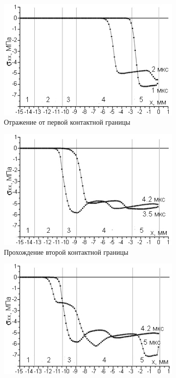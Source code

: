 \begin{figure}[h]
\centering
\begin{subfigure}[b]{0.6\textwidth}
\centering
\includegraphics[width=\textwidth]{png/cranium/1d-01.png}
\caption{Отражение от первой контактной границы}
\end{subfigure}
\begin{subfigure}[b]{0.6\textwidth}
\centering
\includegraphics[width=\textwidth]{png/cranium/1d-02.png}
\caption{Прохождение второй контактной границы}
\end{subfigure}
\begin{subfigure}[b]{0.6\textwidth}
\centering
\includegraphics[width=\textwidth]{png/cranium/1d-03.png}

\end{subfigure}
\end{figure}
